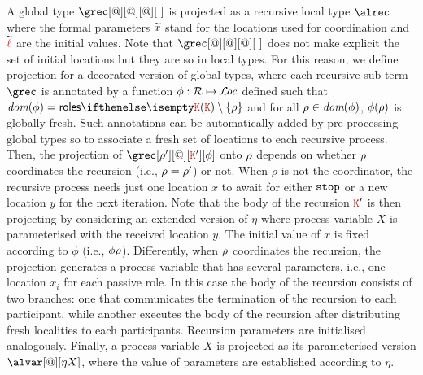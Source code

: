  A global type $\grec[@][@][@][\ ]$ is projected as a recursive 
local type $\alrec$ where the formal parameters $\seq x$ stand 
for the locations used for coordination and 
$\seq \alocvar$ are the initial values. 
%
Note that $\grec[@][@][@][\ ]$ does not make explicit the set of 
initial locations but they are so in local types. 
%
For this reason, we
define projection for a decorated version of global types, where 
each recursive sub-term $\grec$ is annotated by a function
$\aphi:\roleset \mapsto \locset$
defined such that $\dom\aphi = \roles\aK\setminus\{\arole\}$ and 
 for all $\arole\in\dom\aphi$,  $\aphi(\arole)$ is globally fresh.
%
Such annotations can be  automatically added by pre-processing  
global types so to associate a fresh set of locations to each recursive
process. 
%
Then, the projection of 
 $\grec[\arole'][@][\aK'][\aphi]$ onto $\arole$ depends on whether $\arole$
 coordinates the recursion  (i.e., $\arole = \arole'$) or not. 
%
When $\rho$ is not 
 the coordinator, the recursive process needs just one location $x$ to await for 
 either $\asort[stop]$ or a new location $y$ for the next iteration.
%
Note 
 that the body of the recursion $\aK'$ is then projecting by considering an extended 
 version of $\eta$ where process variable $X$ is parameterised with the received 
 location $y$. 
%
The initial value of  $x$ is fixed  according to  
$\phi$  (i.e., $\phi\arole$). 
%
Differently, when $\arole$ coordinates the recursion, the projection generates 
a process variable that has several parameters, i.e., one location $x_i$ for 
each passive role. 
%
In this case the body of the recursion consists of two 
branches: one that communicates the termination of the recursion to 
each participant, while another executes the body of the recursion after
distributing fresh localities to each participants. 
%
Recursion parameters are
initialised analogously. 
%
Finally, a process variable $X$ is projected as its parameterised version 
$\alvar [@][\eta X]$, where the value of parameters are established according 
to $\eta$.


